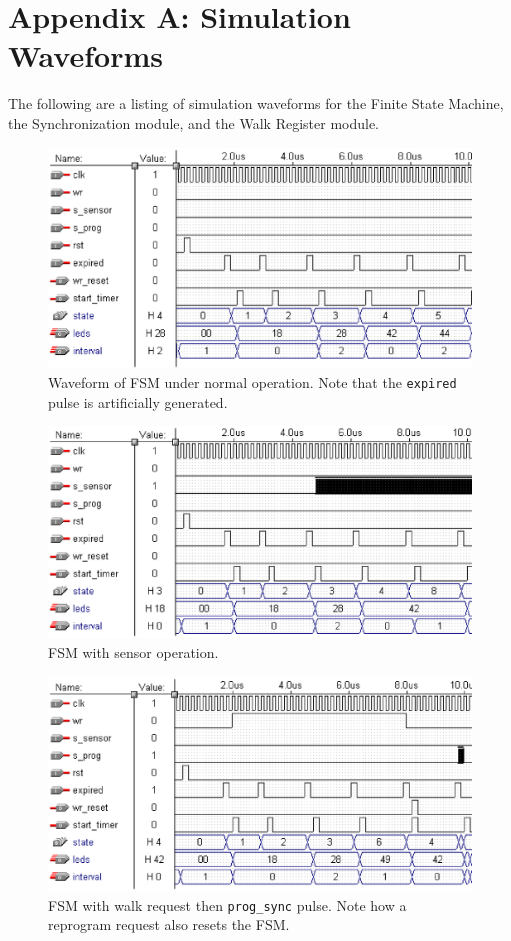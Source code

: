 \documentclass[11]{article}
\begin{document}
\newpage
\section{Appendix A: Simulation Waveforms}
	The following are a listing of simulation waveforms for the Finite State
	Machine, the Synchronization module, and the Walk Register module.

	\begin{figure}[h]
	\centering
	\includegraphics[scale=0.40]{sim1.ps}
	\caption{Waveform of FSM under normal operation.  Note that the \texttt{expired} pulse is artificially generated.}
	\label{fig:sim1}
	\end{figure}

	\begin{figure}[h]
	\centering
	\includegraphics[scale=0.40]{sim2.ps}
	\caption{FSM with sensor operation.}
	\label{fig:sim2}
	\end{figure}

	\begin{figure}[h]
	\centering
	\includegraphics[scale=0.40]{sim3.ps}
	\caption{FSM with walk request then \texttt{prog\_sync} pulse.  Note how a reprogram request also resets the FSM.}
	\label{fig:sim3}
	\end{figure}
\end{document}
